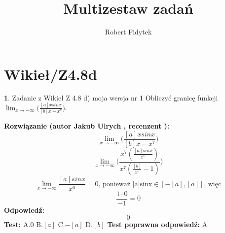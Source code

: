 \documentclass[12pt, a4paper]{article}
\title{Multizestaw zadań}
\author{Robert Fidytek}
\date{}
\theoremstyle{definition} %
\newtheorem{zad}{}
\newcommand{\kategoria}[1]{\section{#1}} %
\newcommand{\zadStart}[1]{\begin{zad}#1\newline} %
\newcommand{\zadStop}{\end{zad}}   %
\newcommand{\rozwStart}[2]{\noindent \textbf{Rozwiązanie (autor #1 , recenzent #2): }\newline} %
\newcommand{\rozwStop}{\newline}                                            %
\newcommand{\odpStart}{\noindent \textbf{Odpowiedź:}\newline}    %
\newcommand{\odpStop}{\newline}                                             %
\newcommand{\testStart}{\noindent \textbf{Test:}\newline} %
\newcommand{\testStop}{\newline} %
\newcommand{\kluczStart}{\noindent \textbf{Test poprawna odpowiedź:}\newline} %
\newcommand{\kluczStop}{\newline} %
\begin{document}
\maketitle


\kategoria{Wikieł/Z4.8d}
\zadStart{Zadanie z Wikieł Z 4.8 d) moja wersja nr 1}
Obliczyć granicę funkcji $\lim_{x \to -\infty}\bigg(\frac{[a]xsinx}{[b]x-x^{7}}\bigg)$.
\zadStop
\rozwStart{Jakub Ulrych}{}
$$\lim_{x \to -\infty}\bigg(\frac{[a]xsinx}{[b]x-x^{7}}\bigg)$$
$$\lim_{x \to -\infty}\bigg(\frac{x^{7}(\frac{[a]sinx}{x^{6}})}{x^{7}(\frac{[b]}{x^{6}}-1)}\bigg)$$
$$\lim_{x \to -\infty}\frac{[a]sinx}{x^{6}}=0\text{, ponieważ [a]sinx}\in[-[a],[a]]\text{, więc}$$
$$\frac{1\cdot0}{-1}=0$$
\rozwStop
\odpStart
$$0$$
\odpStop
\testStart
A.$0$
B.$[a]$
C.$-[a]$
D.$[b]$
\testStop
\kluczStart
A
\kluczStop
\end{document}
